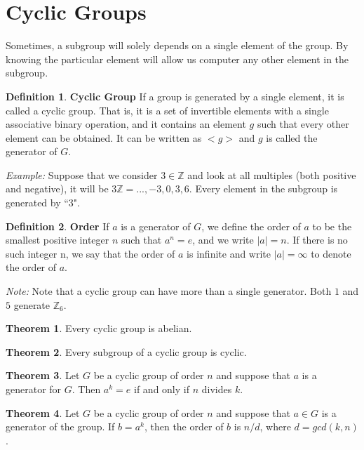 \documentclass{article}
\theoremstyle{definition}
\newtheorem{defi}{Definition}[subsection]
\newtheorem{theorem}{Theorem}[subsection]
\begin{document}
\section{Cyclic Groups}
Sometimes, a subgroup will solely depends on a single element of the group. By knowing the particular element will allow us computer any other element in the subgroup.
\begin{defi}
\textbf{Cyclic Group} If a group is generated by a single element, it is called a cyclic group. That is, it is a set of invertible elements with a single associative binary operation, and it contains an element $g$ such that every other element can be obtained. It can be written as $<g>$ and $g$ is called the generator of $G$.

\textit{Example: } Suppose that we consider $3\in\mathbb{Z}$ and look at all multiples (both positive and negative), it will be $3\mathbb{Z}={..., -3, 0, 3, 6}$. Every element in the subgroup is generated by ``3". 
\end{defi}

\begin{defi}
\textbf{Order} If $a$ is a generator of $G$, we define the order of $a$ to be the smallest positive integer $n$ such that $a^n=e$, and we write $|a|=n$. If there is no such integer n, we say that the order of $a$ is infinite and write $|a|=\infty$ to denote the order of $a$.
\end{defi}

\textit{Note:} Note that a cyclic group can have more than a single generator. Both $1$ and $5$ generate $\mathbb{Z}_6$.

\begin{theorem}
Every cyclic group is abelian.
\end{theorem}

\begin{theorem}
Every subgroup of a cyclic group is cyclic.
\end{theorem}

\begin{theorem}
Let $G$ be a cyclic group of order $n$ and suppose that $a$ is a generator for $G$. Then $a^{k}=e$ if and only if $n$ divides $k$.
\end{theorem}

\begin{theorem}
Let $G$ be a cyclic group of order $n$ and suppose that $a\in G$ is a generator of the group. If $b=a^{k}$, then the order of $b$ is $n/d$, where $d=gcd(k,n)$.
\end{theorem}
\end{document}
